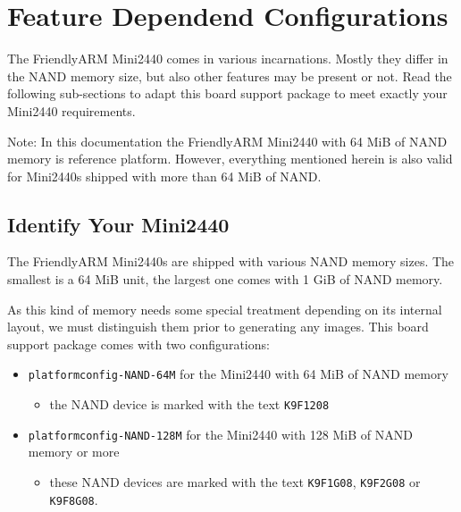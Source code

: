 %
%
%
%
%
%
%

\section{Feature Dependend Configurations}	\label{sec:featuremini2440}

The FriendlyARM Mini2440 comes in various incarnations. Mostly they differ in
the NAND memory size, but also other features may be present or not. Read the
following sub-sections to adapt this board support package to meet exactly
your Mini2440 requirements.

Note: In this documentation the FriendlyARM Mini2440 with 64 MiB of NAND
memory is reference platform. However, everything mentioned herein is also
valid for Mini2440s shipped with more than 64 MiB of NAND.

\subsection{Identify Your Mini2440}		\label{sec:identifymini2440}

The FriendlyARM Mini2440s are shipped with various NAND memory sizes. The
smallest is a 64 MiB unit, the largest one comes with 1 GiB of NAND memory.

As this kind of memory needs some special treatment depending on its internal
layout, we must distinguish them prior to generating any images. This board
support package comes with two configurations:

\begin{itemize}
 \item \texttt{platformconfig-NAND-64M} for the Mini2440 with 64 MiB of NAND
   memory
  \begin{itemize}
   \item the NAND device is marked with the text \texttt{K9F1208}
  \end{itemize}
 \item \texttt{platformconfig-NAND-128M} for the Mini2440 with
  128 MiB of NAND memory or more
  \begin{itemize}
    \item these NAND devices are marked with the text \texttt{K9F1G08},
   \texttt{K9F2G08} or \texttt{K9F8G08}.
  \end{itemize}
\end{itemize}

